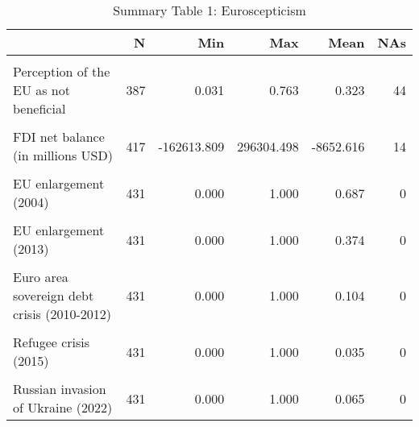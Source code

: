 \begin{table}[!h]
\centering
\caption{Summary Table 1: Euroscepticism}
\centering
\begin{tabular}[t]{lrrrrr}
\toprule
  & N & Min & Max & Mean & NAs\\
\midrule
\cellcolor{gray!10}{Euroscepticism} & \cellcolor{gray!10}{431} & \cellcolor{gray!10}{0.020} & \cellcolor{gray!10}{0.441} & \cellcolor{gray!10}{0.239} & \cellcolor{gray!10}{0}\\
Perception of the EU as not beneficial & 387 & 0.031 & 0.763 & 0.323 & 44\\
\cellcolor{gray!10}{Trade balance of goods (in millions USD)} & \cellcolor{gray!10}{431} & \cellcolor{gray!10}{-225912.428} & \cellcolor{gray!10}{310919.010} & \cellcolor{gray!10}{1776.691} & \cellcolor{gray!10}{0}\\
FDI net balance (in millions USD) & 417 & -162613.809 & 296304.498 & -8652.616 & 14\\
\cellcolor{gray!10}{Migrant to native workers ratio} & \cellcolor{gray!10}{417} & \cellcolor{gray!10}{0.005} & \cellcolor{gray!10}{1.365} & \cellcolor{gray!10}{0.194} & \cellcolor{gray!10}{14}\\
\addlinespace
EU enlargement (2004) & 431 & 0.000 & 1.000 & 0.687 & 0\\
\cellcolor{gray!10}{EU enlargement (2007)} & \cellcolor{gray!10}{431} & \cellcolor{gray!10}{0.000} & \cellcolor{gray!10}{1.000} & \cellcolor{gray!10}{0.582} & \cellcolor{gray!10}{0}\\
EU enlargement (2013) & 431 & 0.000 & 1.000 & 0.374 & 0\\
\cellcolor{gray!10}{Brexit (2020) / COVID-19} & \cellcolor{gray!10}{431} & \cellcolor{gray!10}{0.000} & \cellcolor{gray!10}{1.000} & \cellcolor{gray!10}{0.130} & \cellcolor{gray!10}{0}\\
Euro area sovereign debt crisis (2010-2012) & 431 & 0.000 & 1.000 & 0.104 & 0\\
\addlinespace
\cellcolor{gray!10}{Annexation of Crimea by Russia (2014)} & \cellcolor{gray!10}{431} & \cellcolor{gray!10}{0.000} & \cellcolor{gray!10}{1.000} & \cellcolor{gray!10}{0.035} & \cellcolor{gray!10}{0}\\
Refugee crisis (2015) & 431 & 0.000 & 1.000 & 0.035 & 0\\
\cellcolor{gray!10}{COVID-19 (2020-2021)} & \cellcolor{gray!10}{431} & \cellcolor{gray!10}{0.000} & \cellcolor{gray!10}{1.000} & \cellcolor{gray!10}{0.065} & \cellcolor{gray!10}{0}\\
Russian invasion of Ukraine (2022) & 431 & 0.000 & 1.000 & 0.065 & 0\\
\bottomrule
\end{tabular}
\end{table}

